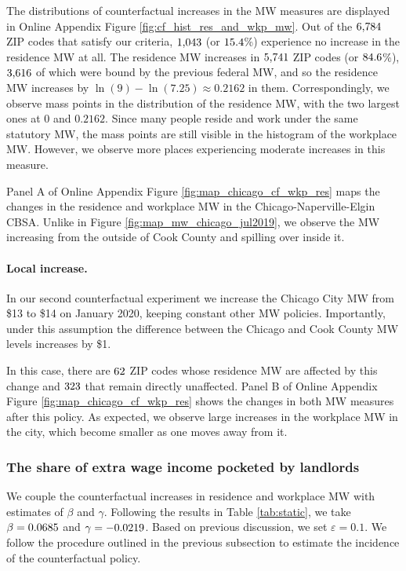 The distributions of counterfactual increases in the MW measures are displayed 
in Online Appendix Figure \ref{fig:cf_hist_res_and_wkp_mw}.
Out of the $\textnormal{6,784}$ ZIP codes that satisfy our criteria, 
$\textnormal{1,043}$ (or $\textnormal{15.4}$\%) experience no increase in 
the residence MW at all.
The residence MW increases in $\textnormal{5,741}$ ZIP codes  (or $\textnormal{84.6}$\%), 
$\textnormal{3,616}$ of which were bound by the previous federal MW, and 
so the residence MW increases by $\ln(9)-\ln(7.25)\approx 0.2162$ in them.
Correspondingly, we observe mass points in the distribution of the residence MW,
with the two largest ones at $0$ and $0.2162$.
Since many people reside and work under the same statutory MW, the mass points 
are still visible in the histogram of the workplace MW.
However, we observe more places experiencing moderate increases in this measure.

Panel A of Online Appendix Figure \ref{fig:map_chicago_cf_wkp_res} maps the 
changes in the residence and workplace MW in the Chicago-Naperville-Elgin CBSA.
Unlike in Figure \ref{fig:map_mw_chicago_jul2019}, we observe the MW increasing 
from the outside of Cook County and spilling over inside it.

\paragraph{Local increase.}

In our second counterfactual experiment we increase the Chicago City MW 
from \$13 to \$14 on January 2020, keeping constant other MW policies.
Importantly, under this assumption the difference between the Chicago
and Cook County MW levels increases by \$1.

In this case, there are $\textnormal{62}$ ZIP codes whose 
residence MW are affected by this change and $\textnormal{323}$ 
that remain directly unaffected.
Panel B of Online Appendix Figure \ref{fig:map_chicago_cf_wkp_res} shows the 
changes in both MW measures after this policy.
As expected, we observe large increases in the workplace MW in the city, 
which become smaller as one moves away from it.

\subsubsection{The share of extra wage income pocketed by landlords}
\label{sec:cf_rents_and_wage_changes}

We couple the counterfactual increases in residence and workplace MW with 
estimates of $\beta$ and $\gamma$.
Following the results in Table \ref{tab:static}, we take 
$\beta = 0.0685$ and 
$\gamma = -0.0219$.
Based on previous discussion, we set $\varepsilon = 0.1$.
We follow the procedure outlined in the previous subsection to estimate the 
incidence of the counterfactual policy.

